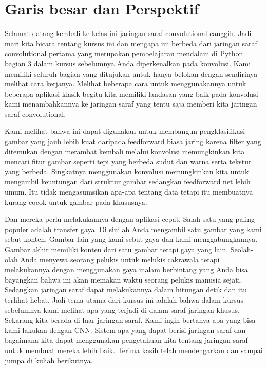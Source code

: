 \chapter{Garis besar dan Perspektif}
Selamat datang kembali ke kelas ini jaringan saraf convolutional canggih. Jadi mari kita bicara tentang kursus ini dan mengapa ini berbeda dari jaringan saraf convolutional pertama yang merupakan pembelajaran mendalam di Python bagian 3 dalam kursus sebelumnya Anda diperkenalkan pada konvolusi. Kami memiliki seluruh bagian yang ditujukan untuk hanya belokan dengan sendirinya melihat cara kerjanya. Melihat beberapa cara untuk menggunakannya untuk beberapa aplikasi klasik begitu kita memiliki landasan yang baik pada konvolusi kami menambahkannya ke jaringan saraf yang tentu saja memberi kita jaringan saraf convolutional.

Kami melihat bahwa ini dapat digunakan untuk membangun pengklasifikasi gambar yang jauh lebih kuat daripada feedforward biasa jaring karena filter yang ditemukan dengan merambat kembali melalui konvolusi memungkinkan kita mencari fitur gambar seperti tepi yang berbeda sudut dan warna serta tekstur yang berbeda. Singkatnya menggunakan konvolusi memungkinkan kita untuk mengambil keuntungan dari struktur gambar sedangkan feedforward net lebih umum.
Itu tidak mengasumsikan apa-apa tentang data tetapi itu membuatnya kurang cocok untuk gambar pada khususnya.

Dan mereka perlu melakukannya dengan aplikasi cepat. Salah satu yang paling populer adalah transfer gaya. Di sinilah Anda mengambil satu gambar yang kami sebut konten. Gambar lain yang kami sebut gaya dan kami menggabungkannya. Gambar akhir memiliki konten dari satu gambar tetapi gaya yang lain. Seolah-olah Anda menyewa seorang pelukis untuk melukis cakrawala tetapi melakukannya dengan menggunakan gaya malam berbintang yang Anda bisa bayangkan bahwa ini akan memakan waktu seorang pelukis manusia sejati. Sedangkan jaringan saraf dapat melakukannya dalam hitungan detik dan itu terlihat hebat. Jadi tema utama dari kursus ini adalah bahwa dalam kursus sebelumnya kami melihat apa yang terjadi di dalam saraf jaringan khusus. Sekarang kita berada di luar jaringan saraf. Kami ingin bertanya apa yang bisa kami lakukan dengan CNN. Sistem apa yang dapat berisi jaringan saraf dan bagaimana kita dapat menggunakan pengetahuan kita tentang jaringan saraf untuk membuat mereka lebih baik. Terima kasih telah mendengarkan dan sampai jumpa di kuliah berikutnya.